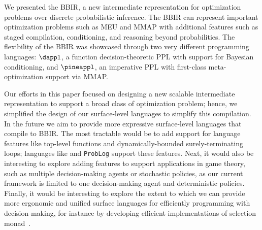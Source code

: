 We presented the BBIR, a new intermediate representation for optimization problems
over discrete probabilistic inference. The BBIR can represent important optimization
problems such as MEU and MMAP with additional features such as staged compilation,
conditioning, and reasoning beyond probabilities. The flexibility of the BBIR
was showcased through two very different programming languages: $\dappl$,
a function decision-theoretic PPL with support for Bayesian conditioning,
and $\pineappl$, an imperative PPL with first-class meta-optimization support
via MMAP.

Our efforts in this paper focused on designing a new scalable intermediate
representation to support a broad class of optimization problem; hence, we
simplified the design of our surface-level languages to simplify this
compilation.  In the future we aim to provide more expressive surface-level
languages that compile to BBIR. The most tractable would be to add support
for language features like top-level functions and dynamically-bounded
surely-terminating loops; languages like \dice{} and \texttt{ProbLog} support
these features.
Next, it would also be interesting to explore adding features to support applications in game theory,
such as multiple decision-making agents or stochastic policies,
as our current framework is limited to one decision-making agent and deterministic policies.
Finally, it would be interesting to explore
the extent to which we can provide more ergonomic and unified surface languages
for efficiently programming with decision-making, for instance by developing
efficient implementations of selection monad~\citep{abadi2021smart,lago2022reinforcement}.







